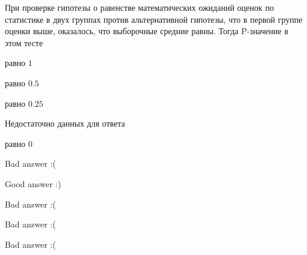 
\begin{question}
При проверке гипотезы о равенстве математических ожиданий оценок по
статистике в двух группах против альтернативной гипотезы, что в первой
группе оценки выше, оказалось, что выборочные средние равны. Тогда
P-значение в этом тесте
\begin{answerlist}
  \item равно \(1\)
  \item равно \(0.5\)
  \item равно \(0.25\)
  \item Недостаточно данных для ответа
  \item равно \(0\)
\end{answerlist}
\end{question}

\begin{solution}
\begin{answerlist}
  \item Bad answer :(
  \item Good answer :)
  \item Bad answer :(
  \item Bad answer :(
  \item Bad answer :(
\end{answerlist}
\end{solution}

